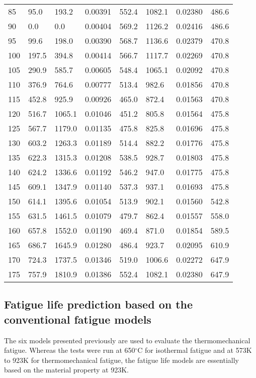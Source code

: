 \begin{table}[htbp]
\begin{tabular}{p{1.5cm}p{1.5cm}p{1.5cm}p{1.5cm}p{1.5cm}p{1.5cm}p{1.5cm}p{1.5cm}}
    85    & 95.0  & 193.2  & 0.00391  & 552.4  & 1082.1  & 0.02380  & 486.6  \\
    90    & 0.0   & 0.0   & 0.00404  & 569.2  & 1126.2  & 0.02416  & 486.6  \\
    95    & 99.6  & 198.0  & 0.00390  & 568.7  & 1136.6  & 0.02379  & 470.8  \\
    100   & 197.5  & 394.8  & 0.00414  & 566.7  & 1117.7  & 0.02269  & 470.8  \\
    105   & 290.9  & 585.7  & 0.00605  & 548.4  & 1065.1  & 0.02092  & 470.8  \\
    110   & 376.9  & 764.6  & 0.00777  & 513.4  & 982.6  & 0.01856  & 470.8  \\
    115   & 452.8  & 925.9  & 0.00926  & 465.0  & 872.4  & 0.01563  & 470.8  \\
    120   & 516.7  & 1065.1  & 0.01046  & 451.2  & 805.8  & 0.01564  & 475.8  \\
    125   & 567.7  & 1179.0  & 0.01135  & 475.8  & 825.8  & 0.01696  & 475.8  \\
    130   & 603.2  & 1263.3  & 0.01189  & 514.4  & 882.2  & 0.01776  & 475.8  \\
    135   & 622.3  & 1315.3  & 0.01208  & 538.5  & 928.7  & 0.01803  & 475.8  \\
    140   & 624.2  & 1336.6  & 0.01192  & 546.2  & 947.0  & 0.01775  & 475.8  \\
    145   & 609.1  & 1347.9  & 0.01140  & 537.3  & 937.1  & 0.01693  & 475.8  \\
    150   & 614.1  & 1395.6  & 0.01054  & 513.9  & 902.1  & 0.01560  & 542.8  \\
    155   & 631.5  & 1461.5  & 0.01079  & 479.7  & 862.4  & 0.01557  & 558.0  \\
    160   & 657.8  & 1552.0  & 0.01190  & 469.4  & 871.0  & 0.01854  & 589.5  \\
    165   & 686.7  & 1645.9  & 0.01280  & 486.4  & 923.7  & 0.02095  & 610.9  \\
    170   & 724.3  & 1737.5  & 0.01346  & 519.0  & 1006.6  & 0.02272  & 647.9  \\
    175   & 757.9  & 1810.9  & 0.01386  & 552.4  & 1082.1  & 0.02380  & 647.9  \\
    \bottomrule
    \end{tabular}%
  \label{tab:addlabel}%
\end{table}%



\subsection{Fatigue life prediction based on the conventional fatigue models}
\noindent
The six models presented previously are used to evaluate the thermomechanical fatigue. Whereas the tests were run at 650$^\circ$C for isothermal fatigue and at 573K to 923K for thermomechanical fatigue, the fatigue life models are essentially based on the material property at 923K.


